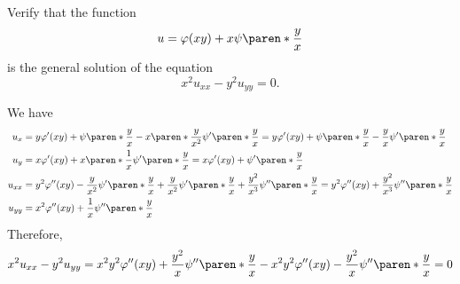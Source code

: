 \documentclass[11pt]{penrose}
\begin{document}
\begin{problem}{5}
    Verify that the function
    \begin{equation*}
        u = \varphi(xy) + x \psi\paren*{\frac{y}{x}}
    \end{equation*}
    is the general solution of the equation
    \begin{equation*}
        x^2 u_{xx} - y^2 u_{yy} = 0.
    \end{equation*}

    \solution We have
    \begin{align*}
        u_{x} &= y \varphi'(xy) + \psi\paren*{\frac{y}{x}} - x \paren*{\frac{y}{x^2}} \psi'\paren*{\frac{y}{x}} = y \varphi'(xy) + \psi\paren*{\frac{y}{x}} - \frac{y}{x} \psi'\paren*{\frac{y}{x}}\\
        u_{y} &= x \varphi'(xy) + x \paren*{\frac{1}{x}} \psi'\paren*{\frac{y}{x}} = x \varphi'(xy) + \psi'\paren*{\frac{y}{x}}\\
        u_{xx} &= y^2 \varphi''(xy) - \frac{y}{x^2} \psi'\paren*{\frac{y}{x}} + \frac{y}{x^2} \psi'\paren*{\frac{y}{x}} + \frac{y^2}{x^3} \psi''\paren*{\frac{y}{x}}
        = y^2 \varphi''(xy) + \frac{y^2}{x^3} \psi''\paren*{\frac{y}{x}}\\
        u_{yy} &= x^2 \varphi''(xy) + \frac{1}{x} \psi''\paren*{\frac{y}{x}}
    \end{align*}
    Therefore,
    \begin{equation*}
        x^2 u_{xx} - y^2 u_{yy} = x^2 y^2 \varphi''(xy) + \frac{y^2}{x} \psi''\paren*{\frac{y}{x}} - x^2 y^2 \varphi''(xy) - \frac{y^2}{x} \psi''\paren*{\frac{y}{x}} = 0
    \end{equation*}
\end{problem}
\end{document}
